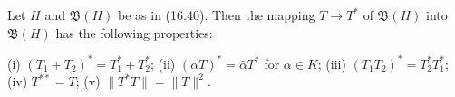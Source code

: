 Let $H$ and $\mathfrak{B}(H)$ be as in (16.40). Then the mapping $T \rightarrow T^*$ of $\mathfrak{B}(H)$ into $\mathfrak{B}(H)$ has the following properties:

(i) $(T_1 + T_2)^* = T_1^* + T_2^*$;
(ii) $(\alpha T)^* = \bar{\alpha} T^*$ for $\alpha \in K$;
(iii) $(T_1 T_2)^* = T_2^* T_1^*$;
(iv) $T^{**} = T$;
(v) $\|T^* T\| = \|T\|^2$.